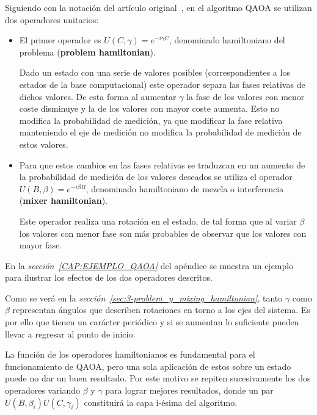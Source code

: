 Siguiendo con la notación del artículo original~\cite{qaoa_paper_original}, en el algoritmo QAOA se utilizan dos operadores unitarios:
\begin{itemize}
\item El primer operador es $U(C, \gamma) = e^{-i \gamma C}$, denominado hamiltoniano del problema (\textbf{problem hamiltonian}).

  Dado un estado con una serie de valores posibles (correspondientes a los estados de la base computacional) este operador separa las fases relativas de dichos valores.
  De esta forma al aumentar $\gamma$ la fase de los valores con menor coste disminuye y la de los valores con mayor coste aumenta.
  Esto no modifica la probabilidad de medición, ya que modificar la fase relativa manteniendo el eje de medición no modifica la probabilidad de medición de estos valores.

\item Para que estos cambios en las fases relativas se traduzcan en un aumento de la probabilidad de medición de los valores deseados se utiliza el operador $U(B, \beta) = e^{-i \beta B}$, denominado hamiltoniano de mezcla o interferencia (\textbf{mixer hamiltonian}).

  Este operador realiza una rotación en el estado, de tal forma que al variar $\beta$ los valores con menor fase son más probables de observar que los valores con mayor fase.

\end{itemize}

En la \textit{sección~\ref{CAP:EJEMPLO_QAOA}} del apéndice se muestra un ejemplo para ilustrar los efectos de los dos operadores descritos.

Como se verá en la \textit{sección~\ref{sec:3-problem_y_mixing_hamiltonian}}, tanto $\gamma$ como $\beta$ representan ángulos que describen rotaciones en torno a los ejes del sistema.
Es por ello que tienen un carácter periódico y si se aumentan lo suficiente pueden llevar a regresar al punto de inicio.

La función de los operadores hamiltonianos es fundamental para el funcionamiento de QAOA, pero una sola aplicación de estos sobre un estado puede no dar un buen resultado.
Por este motivo se repiten sucesivamente los dos operadores variando $\beta$ y $\gamma$ para lograr mejores resultados, donde un par $U(B, \beta_i)U(C, \gamma_i)$ constituirá la capa i-ésima del algoritmo.


